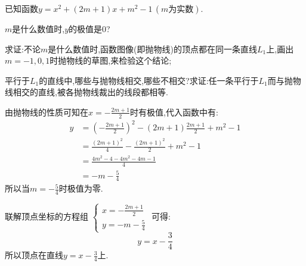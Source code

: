 \begin{questions}
	\question 已知函数$y=x^2 + (2m+1)x + m^2 - 1\, (m\text{为实数})$.
	\begin{penum}
		\item $m$是什么数值时,$y$的极值是$0$?
		\item
		      求证:不论$m$是什么数值时,函数图像(即抛物线)的顶点都在同一条直线$L_1$上,画出$m=-1,0,1$时抛物线的草图,来检验这个结论;
		\item
		      平行于$L_1$的直线中,哪些与抛物线相交,哪些不相交?求证:任一条平行于$L_1$而与抛物线相交的直线,被各抛物线裁出的线段都相等.
	\end{penum}

	\begin{solution}
		\begin{penum}
			\item 由抛物线的性质可知在$x=-\frac{2m+1}{2}$时有极值,代入函数中有:
			      \begin{align*}
				      y & = (-\frac{2m+1}{2})^2 - (2m+1)\frac{2m+1}{2} + m^2 - 1 \\
				        & = \frac{(2m+1)^2}{4} - \frac{(2m+1)^2}{2} + m^2 - 1    \\
				        & = \frac{4m^2 - 4 - 4m^2 - 4m - 1}{4}                   \\
				        & = -m - \frac54
			      \end{align*}
			      所以当$m=-\frac54$时极值为零.
			\item 联解顶点坐标的方程组
			      \begin{math}
				      \begin{cases}
					      x = -\frac{2m+1}{2} \\
					      y = -m - \frac54
				      \end{cases}
			      \end{math}
			      可得:
			      \begin{equation*}
				      y = x - \frac34
			      \end{equation*}
			      所以顶点在直线$y=x - \frac34$上.

			      \begin{center}
			      \end{center}


\end{penum}
\end{solution}
\end{questions}
